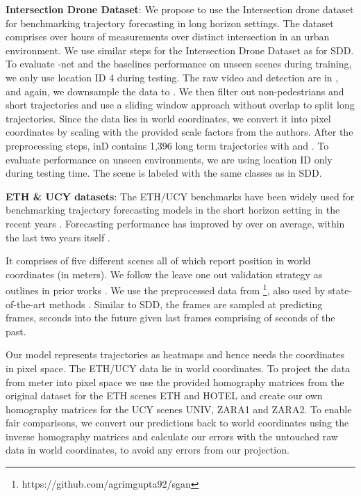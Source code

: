 \documentclass[final]{cvpr}
\begin{document}
\noindent \textbf{Intersection Drone Dataset}: We propose to use the Intersection drone dataset \cite{inDdataset} for benchmarking trajectory forecasting in long horizon settings. The dataset comprises over  hours of measurements over  distinct intersection in an urban environment. We use similar steps for the Intersection Drone Dataset as for SDD. To evaluate -net and the baselines performance on unseen scenes during training, we only use location ID 4 during testing. The raw video and detection are in , and again, we downsample the data to . We then filter out non-pedestrians and  short  trajectories  and  use  a  sliding  window  approach without overlap to split long trajectories. Since the data lies in world coordinates, we convert it into pixel coordinates by scaling with the provided scale factors from the authors. After the preprocessing steps, inD contains 1,396 long term trajectories with  and . To evaluate performance on unseen environments, we are using location ID  only during testing time. The scene is labeled with the same  classes as in SDD.



\noindent \textbf{ETH \& UCY datasets}: The ETH/UCY benchmarks have been widely used for benchmarking trajectory forecasting models in the short horizon setting in the recent years \cite{PWCeth}. Forecasting performance has improved by over  on average, within the last two years itself \cite{gupta2018social}.

It comprises of five different scenes all of which report position in world coordinates (in meters). We follow the leave one out validation strategy as outlines in prior works \cite{gupta2018social, sadeghian2019sophie, deo2020trajectory, salzmann2020trajectron++}. We use the preprocessed data from \cite{gupta2018social} \footnote{https://github.com/agrimgupta92/sgan}, also used by state-of-the-art methods \cite{mangalam2020not, salzmann2020trajectron++}. Similar to SDD, the frames are sampled at  predicting  frames,  seconds into the future given last  frames comprising of  seconds of the past.

Our model represents trajectories as heatmaps and hence needs the coordinates in pixel space. The ETH/UCY data lie in world coordinates. To project the data from meter into pixel space we use the provided homography matrices from the original dataset for the ETH \cite{pellegrini2010improving} scenes ETH and HOTEL and create our own homography matrices for the UCY\cite{lerner2007crowds} scenes UNIV, ZARA1 and ZARA2. To enable fair comparisons, we convert our predictions back to world coordinates using the inverse homography matrices and calculate our errors with the untouched raw data in world coordinates, to avoid any errors from our projection. 
\end{document}
